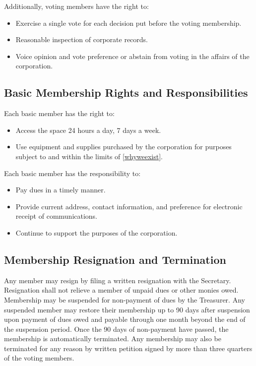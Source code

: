 \documentclass[10pt,letterpaper,titlepage]{article}
\begin{document}
Additionally, voting members have the right to:
\begin{itemize}
    \item Exercise a single vote for each decision put before the voting
        membership.

    \item Reasonable inspection of corporate records.

    \item Voice opinion and vote preference or abstain from voting in the
        affairs of the corporation.
\end{itemize}

\subsection{Basic Membership Rights and Responsibilities}

Each basic member has the right to:
\begin{itemize}
    \item Access the space 24 hours a day, 7 days a week.

    \item Use equipment and supplies purchased by the corporation for purposes
        subject to and within the limits of \ref{whyweexist}.
\end{itemize}

Each basic member has the responsibility to:
\begin{itemize}
    \item Pay dues in a timely manner.

    \item Provide current address, contact information, and preference for
        electronic receipt of communications.

    \item Continue to support the purposes of the corporation.
\end{itemize}

\subsection{Membership Resignation and Termination}
Any member may resign by filing a written resignation with the
Secretary.
Resignation shall not relieve a member of unpaid dues or other monies
owed.
Membership may be suspended for non-payment of dues by the Treasurer.
Any suspended member may restore their membership up to 90 days after
suspension upon payment of dues owed and payable through one month beyond the
end of the suspension period.
Once the 90 days of non-payment have passed, the membership is automatically
terminated.
Any membership may also be terminated for any reason by written petition
signed by more than three quarters of the voting members.
\end{document}
